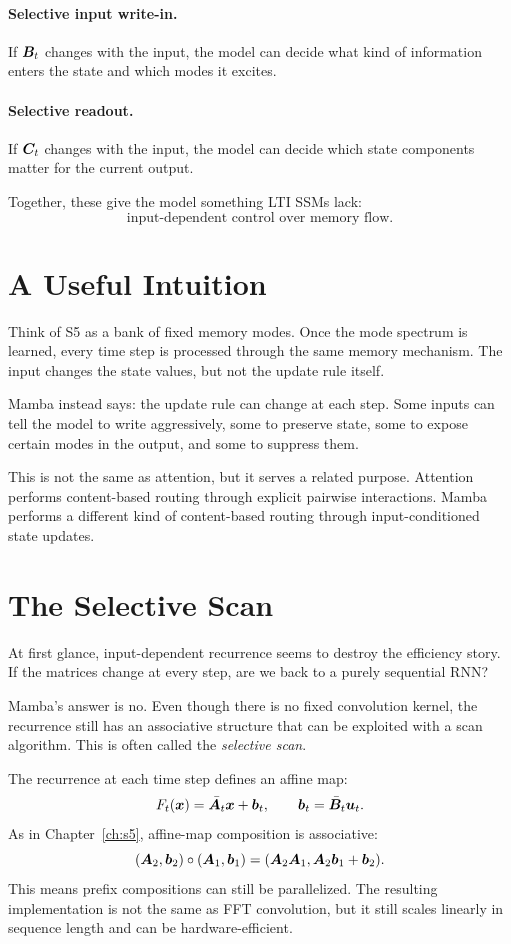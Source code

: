 \paragraph{Selective input write-in.}
If $\bm{B}_t$ changes with the input, the model can decide what kind of information enters the
state and which modes it excites.

\paragraph{Selective readout.}
If $\bm{C}_t$ changes with the input, the model can decide which state components matter for
the current output.

Together, these give the model something LTI SSMs lack:
\[
  \text{input-dependent control over memory flow.}
\]

\section{A Useful Intuition}

Think of S5 as a bank of fixed memory modes. Once the mode spectrum is learned, every time
step is processed through the same memory mechanism. The input changes the state values,
but not the update rule itself.

Mamba instead says: the update rule can change at each step. Some inputs can tell the
model to write aggressively, some to preserve state, some to expose certain modes in the
output, and some to suppress them.

This is not the same as attention, but it serves a related purpose. Attention performs
content-based routing through explicit pairwise interactions. Mamba performs a different
kind of content-based routing through input-conditioned state updates.

\section{The Selective Scan}

At first glance, input-dependent recurrence seems to destroy the efficiency story. If the
matrices change at every step, are we back to a purely sequential RNN?

Mamba's answer is no. Even though there is no fixed convolution kernel, the recurrence
still has an associative structure that can be exploited with a scan algorithm. This is
often called the \emph{selective scan}.

The recurrence at each time step defines an affine map:
\[
  F_t(\bm{x})=\bar{\bm{A}}_t\bm{x}+\bm{b}_t,
  \qquad
  \bm{b}_t=\bar{\bm{B}}_t\bm{u}_t.
\]
As in Chapter~\ref{ch:s5}, affine-map composition is associative:
\[
  (\bm{A}_2,\bm{b}_2)\circ(\bm{A}_1,\bm{b}_1)
  =
  (\bm{A}_2\bm{A}_1,\bm{A}_2\bm{b}_1+\bm{b}_2).
\]
This means prefix compositions can still be parallelized. The resulting implementation is
not the same as FFT convolution, but it still scales linearly in sequence length and can
be hardware-efficient.

